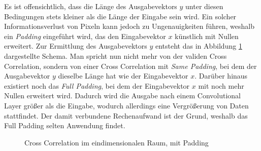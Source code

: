 \documentclass[12pt,a4]{article}
\begin{document}
Es ist offensichtlich, dass die Länge des Ausgabevektors $y$ unter diesen Bedingungen stets kleiner als die Länge der Eingabe sein wird. Ein solcher Informationsverlust von Pixeln kann jedoch zu Ungenauigkeiten führen, weshalb ein \textit{Padding} eingeführt wird, das den Eingabevektor $x$ künstlich mit Nullen erweitert. Zur Ermittlung des Ausgabevektors $y$ entsteht das in Abbildung \ref{fig:CrossCorrelationWithPadding} dargestellte Schema. Man spricht nun nicht mehr von der validen Cross Correlation, sondern von einer Cross Correlation mit \textit{Same Padding}, bei dem der Ausgabevektor $y$ dieselbe Länge hat wie der Eingabevektor $x$. Darüber hinaus existiert noch das \textit{Full Padding}, bei dem der Eingabevektor $x$ mit noch mehr Nullen erweitert wird. Dadurch wird die Ausgabe nach einem Convolutional Layer größer als die Eingabe, wodurch allerdings eine Vergrößerung von Daten stattfindet. Der damit verbundene Rechenaufwand ist der Grund, weshalb das Full Padding selten Anwendung findet.

\begin{figure}[!h]
\centering
{}
\caption{Cross Correlation im eindimensionalen Raum, mit Padding}
\label{fig:CrossCorrelationWithPadding}
\end{figure}
\end{document}
